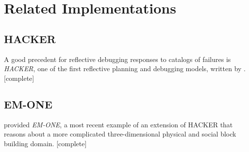 \chapter{Related Implementations}
\label{chapter:related_implementations}

\section{HACKER}

A good precedent for reflective debugging responses to catalogs of
failures is \emph{HACKER}, one of the first reflective planning and
debugging models, written by \cite{sussman:1973}.  [complete]

\section{EM-ONE}

\cite{singh:2005b} provided \emph{EM-ONE}, a most recent example of an
extension of HACKER that reasons about a more complicated
three-dimensional physical and social block building domain.
[complete]

